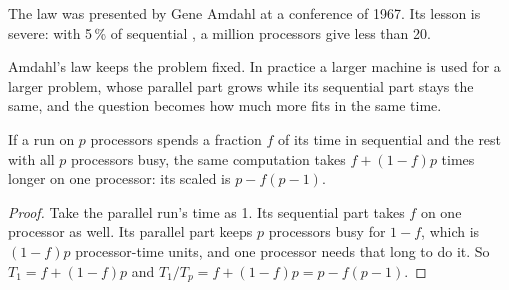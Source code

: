 The law was presented by Gene Amdahl at a conference of 1967. %
Its lesson is severe: with 5\,\% of sequential , a million processors give less than 20.

\begin{omfigure}
\par{}
\end{omfigure}

Amdahl's law keeps the problem fixed. In practice a larger machine is used for a larger problem, whose parallel part grows while its sequential part stays the same, and the question becomes how much more  fits in the same time.

\begin{theorem}\label{thm:b3:parallel-programming:gustafson}
If a run on $p$ processors spends a fraction $f$ of its time in sequential  and the rest with all $p$ processors busy, the same computation takes $f + (1 - f)p$ times longer on one processor: its scaled  is $p - f(p - 1)$.
\end{theorem}

\begin{proof}
Take the parallel run's time as 1. Its sequential part takes $f$ on one processor as well. Its parallel part keeps $p$ processors busy for $1 - f$, which is $(1 - f)p$ processor-time units, and one processor needs that long to do it. So $T_1 = f + (1 - f)p$ and $T_1 / T_p = f + (1 - f)p = p - f(p - 1)$.
\end{proof}

